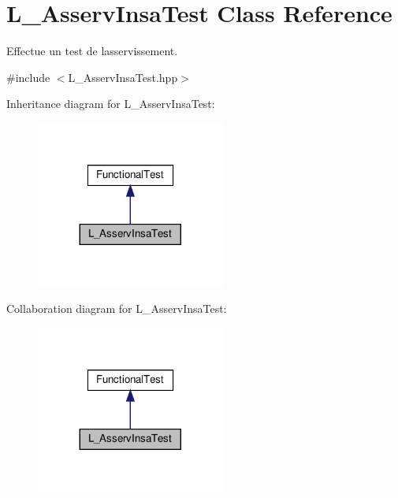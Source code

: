\hypertarget{classL__AsservInsaTest}{}\section{L\+\_\+\+Asserv\+Insa\+Test Class Reference}
\label{classL__AsservInsaTest}


Effectue un test de l\textquotesingle{}asservissement.  




{\ttfamily \#include $<$L\+\_\+\+Asserv\+Insa\+Test.\+hpp$>$}



Inheritance diagram for L\+\_\+\+Asserv\+Insa\+Test\+:
\nopagebreak
\begin{figure}[H]
\begin{center}
\leavevmode
\includegraphics[width=176pt]{classL__AsservInsaTest__inherit__graph}
\end{center}
\end{figure}


Collaboration diagram for L\+\_\+\+Asserv\+Insa\+Test\+:
\nopagebreak
\begin{figure}[H]
\begin{center}
\leavevmode
\includegraphics[width=176pt]{classL__AsservInsaTest__coll__graph}
\end{center}
\end{figure}
